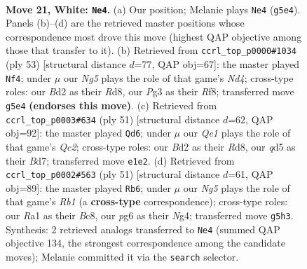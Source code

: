 \documentclass[11pt]{article}
\begin{document}
\begin{figure}[p]
\label{fig:thought-m38}
\end{figure}

\clearpage

\begin{figure}[p]\centering
\begin{subfigure}{0.46\textwidth}\centering
\resizebox{\linewidth}{!}{%
\newchessgame
\chessboard[
  setfen={r1b2rk1/5p2/5np1/2pqp1Np/7P/p1PP2P1/P2B1P2/R3QRK1 w - - 0 21},
  showmover=false,
  pgfstyle=straightmove, color=movearrow, markmove={g5-e4}
]}
\caption{}
\end{subfigure}\hfill
\begin{subfigure}{0.46\textwidth}\centering
\resizebox{\linewidth}{!}{%
\newchessgame
\chessboard[
  setfen={3r1r2/pbq3k1/6p1/2pnp2p/6pP/1PP3Q1/P2N1PP1/3RRBK1 b - - 1 27},
  showmover=false,
  pgfstyle=straightmove, color=movearrow, markmove={d5-f4}
]}
\caption{}
\end{subfigure}
\\[4pt]
\begin{subfigure}{0.46\textwidth}\centering
\resizebox{\linewidth}{!}{%
\newchessgame
\chessboard[
  setfen={2rr4/2qb1pk1/1p4p1/p1pP3p/P5nP/1P3NP1/2Q2P2/R2R1BK1 b - - 0 26},
  showmover=false,
  pgfstyle=straightmove, color=movearrow, markmove={c7-d6}
]}
\caption{}
\end{subfigure}\hfill
\begin{subfigure}{0.46\textwidth}\centering
\resizebox{\linewidth}{!}{%
\newchessgame
\chessboard[
  setfen={1rbq1rk1/5p2/p2p2p1/p6p/4PPnP/2NQ2P1/BP1R4/2K4R b - - 1 26},
  showmover=false,
  pgfstyle=straightmove, color=movearrow, markmove={b8-b6}
]}
\caption{}
\end{subfigure}
\caption{\textbf{Move 21, White: \texttt{Ne4}.} (a) Our position; Melanie plays \texttt{Ne4} (\texttt{g5e4}). Panels (b)--(d) are the retrieved master positions whose correspondence most drove this move (highest QAP objective among those that transfer to it). (b) Retrieved from \texttt{ccrl\_top\_p0000\#1034} (ply 53) [structural distance $d$=77, QAP obj=67]: the master played \texttt{Nf4}; under $\mu$ our \emph{Ng5} plays the role of that game's \emph{Nd4}; cross-type roles: our \emph{B}d2 as their \emph{R}d8, our \emph{P}g3 as their \emph{R}f8; transferred move \texttt{g5e4} \textbf{(endorses this move)}. (c) Retrieved from \texttt{ccrl\_top\_p0003\#634} (ply 51) [structural distance $d$=62, QAP obj=92]: the master played \texttt{Qd6}; under $\mu$ our \emph{Qe1} plays the role of that game's \emph{Qc2}; cross-type roles: our \emph{B}d2 as their \emph{R}d8, our \emph{q}d5 as their \emph{B}d7; transferred move \texttt{e1e2}. (d) Retrieved from \texttt{ccrl\_top\_p0002\#563} (ply 51) [structural distance $d$=61, QAP obj=89]: the master played \texttt{Rb6}; under $\mu$ our \emph{Ng5} plays the role of that game's \emph{Rb1} (a \textbf{cross-type} correspondence); cross-type roles: our \emph{R}a1 as their \emph{B}c8, our \emph{p}g6 as their \emph{N}g4; transferred move \texttt{g5h3}. Synthesis: 2 retrieved analogs transferred to \texttt{Ne4} (summed QAP objective 134, the strongest correspondence among the candidate moves); Melanie committed it via the \texttt{search} selector.}
\label{fig:thought-m40}
\end{figure}
\end{document}
